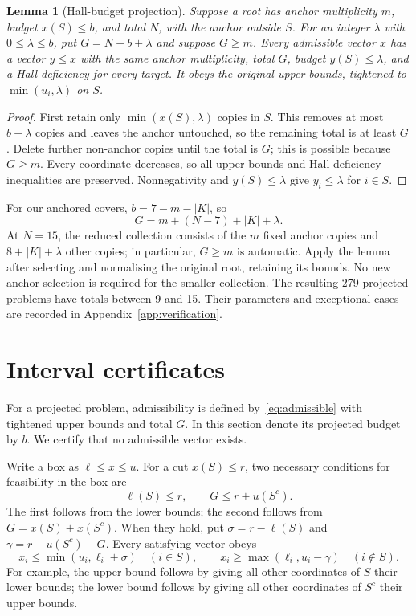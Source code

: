 \documentclass[11pt]{article}
\newtheorem{lemma}[theorem]{Lemma}
\theoremstyle{remark}
\begin{document}
\begin{lemma}[Hall-budget projection]\label{lem:projection}
Suppose a root has anchor multiplicity $m$, budget $x(S)\le b$, and total
$N$, with the anchor outside $S$. For an integer $\lambda$ with
$0\le \lambda\le b$, put $G=N-b+\lambda$
and suppose $G\ge m$. Every admissible vector $x$ has a vector $y\le x$
with the same anchor multiplicity, total $G$, budget $y(S)\le \lambda$, and a
Hall deficiency for every target. It obeys the original upper bounds,
tightened to $\min(u_i,\lambda)$ on $S$.
\end{lemma}
\begin{proof}
First retain only $\min(x(S),\lambda)$ copies in $S$. This removes at most $b-\lambda$
copies and leaves the anchor untouched, so the remaining total is at least
$G$. Delete further non-anchor copies until the total is $G$; this is possible
because $G\ge m$. Every coordinate decreases, so all upper bounds and Hall
deficiency inequalities are preserved. Nonnegativity and $y(S)\le \lambda$ give
$y_i\le \lambda$ for $i\in S$.
\end{proof}

For our anchored covers, $b=7-m-|K|$, so
\[
 G=m+(N-7)+|K|+\lambda.
\]
At $N=15$, the reduced collection consists of the $m$ fixed anchor copies and
$8+|K|+\lambda$ other copies; in particular, $G\ge m$ is automatic. Apply the lemma
after selecting and normalising the original root, retaining its bounds.
No new anchor selection is required for the smaller collection.
The resulting 279 projected problems have totals between 9 and 15.
Their parameters and exceptional cases are recorded in
Appendix~\ref{app:verification}.

\section{Interval certificates}\label{sec:certificates}
For a projected problem, admissibility is defined by~\eqref{eq:admissible}
with tightened upper bounds and total $G$. In this section denote its
projected budget by $b$. We certify that no admissible vector exists.

Write a box as $\ell\le x\le u$. For a cut $x(S)\le r$, two necessary
conditions for feasibility in the box are
\begin{equation}\label{eq:possible}
  \ell(S)\le r,\qquad G\le r+u(S^c).
\end{equation}
The first follows from the lower bounds; the second follows from
$G=x(S)+x(S^c)$. When they hold, put
$\sigma=r-\ell(S)$ and $\gamma=r+u(S^c)-G$. Every satisfying vector obeys
\begin{equation}\label{eq:refine}
 x_i\le\min(u_i,\ell_i+\sigma)\quad(i\in S),\qquad
 x_i\ge\max(\ell_i,u_i-\gamma)\quad(i\notin S).
\end{equation}
For example, the upper bound follows by giving all other coordinates of $S$
their lower bounds; the lower bound follows by giving all other coordinates
of $S^c$ their upper bounds.
\end{document}
